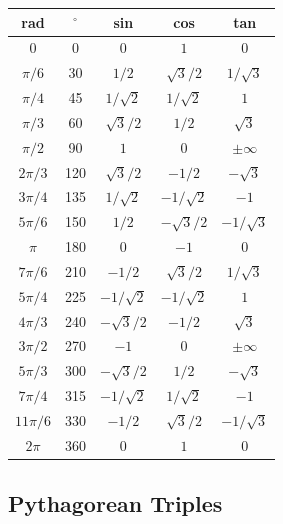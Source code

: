 \documentclass[]{report}
\newcommand{\degrees}{^{\circ}}
\begin{document}
\def\arraystretch{1.5}
\begin{tabular}{ |c|c|c|c|c| } 
\hline
\textbf{rad}	& \textbf{$\degrees$}	& \textbf{sin} 		& \textbf{cos} 	& \textbf{tan} 	\\ 
\hline
$ 0 $	 		& 0		& $0$ 			& $1$	 			& $0$ 							\\
\hline
$\pi/6 $ 		& 30	& $1/2$ 		& $\sqrt{3}/2 $ 	& $1/\sqrt{3}$ 					\\
\hline
$\pi/4 $ 		& 45	& $1/\sqrt{2}$ 	& $1/\sqrt{2} $ 	& $1$							\\
\hline
$\pi/3 $ 		& 60	& $\sqrt{3}/2$ 	& $ 1/2 $	 		& $\sqrt{3}$					\\
\hline
$\pi/2 $ 		& 90	& $1$ 			& $ 0 $ 			& $\pm\infty$					\\
\hline
$2\pi/3 $ 		& 120	& $\sqrt{3}/2$	& $ -1/2 $ 			& $-\sqrt{3}$					\\
\hline
$3\pi/4 $ 		& 135	& $1/\sqrt{2}$	& $ -1/\sqrt{2} $ 	& $-1$							\\
\hline
$5\pi/6 $ 		& 150	& $1/2$			& $ -\sqrt{3}/2 $ 	& $-1/\sqrt{3}$					\\
\hline
$\pi $ 			& 180	& $0$			& $ -1 $		 	& $0$							\\
\hline
$7\pi/6 $ 		& 210	& $-1/2$		& $ \sqrt{3}/2 $	& $1/\sqrt{3}$					\\
\hline
$5\pi/4 $ 		& 225	& $-1/\sqrt{2}$	& $ -1/\sqrt{2} $	& $1$							\\
\hline
$4\pi/3 $ 		& 240	& $-\sqrt{3}/2$	& $ -1/2 $			& $\sqrt{3}$					\\
\hline
$3\pi/2 $ 		& 270	& $-1$			& $ 0 $				& $\pm\infty$					\\
\hline
$5\pi/3 $ 		& 300	& $-\sqrt{3}/2$	& $ 1/2 $			& $-\sqrt{3}$					\\
\hline
$7\pi/4 $ 		& 315	& $-1/\sqrt{2}$	& $	1/\sqrt{2} $	& $-1$							\\
\hline
$11\pi/6 $ 		& 330	& $-1/2$		& $ \sqrt{3}/2 $	& $-1/\sqrt{3}$					\\
\hline
$2\pi $ 		& 360	& $0$			& $ 1 $		 		& $0$							\\
\hline
\end{tabular}            
                   
\subsection{Pythagorean Triples}
\end{document}
